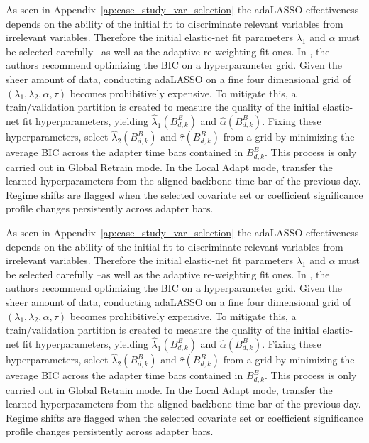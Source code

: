 \documentclass[10pt,a4paper,oneside]{article}
\begin{document}
As seen in Appendix~\ref{ap:case_study_var_selection} the adaLASSO effectiveness depends on the ability of the initial fit to discriminate relevant variables from irrelevant variables. Therefore the initial elastic-net fit parameters \(\lambda_1\) and \(\alpha\) must be selected carefully --as well as the adaptive re-weighting fit ones. In \cite{MEDEIROS2016255}, the authors recommend optimizing the BIC on a hyperparameter grid. Given the sheer amount of data, conducting adaLASSO on a fine four dimensional grid of \((\lambda_1, \lambda_2, \alpha, \tau)\) becomes prohibitively expensive. To mitigate this, a train/validation partition is created to measure the quality of the initial elastic-net fit hyperparameters, yielding  \(\hat{\lambda}_1 \left( B^B_{d, k} \right)\) and \(\hat{\alpha}\left( B^B_{d, k} \right)\). Fixing these hyperparameters, select \(\hat{\lambda}_2\left( B^B_{d, k} \right)\) and \(\hat{\tau}\left( B^B_{d,k} \right)\) from a grid by minimizing the average BIC across the adapter time bars contained in \(B^B_{d,k}\). This process is only carried out in Global Retrain mode. In the Local Adapt mode, transfer the learned hyperparameters from the aligned backbone time bar of the previous day. Regime shifts are flagged when the selected covariate set or coefficient significance profile changes persistently across adapter bars.

As seen in Appendix~\ref{ap:case_study_var_selection} the adaLASSO effectiveness depends on the ability of the initial fit to discriminate relevant variables from irrelevant variables. Therefore the initial elastic-net fit parameters \(\lambda_1\) and \(\alpha\) must be selected carefully --as well as the adaptive re-weighting fit ones. In \cite{MEDEIROS2016255}, the authors recommend optimizing the BIC on a hyperparameter grid. Given the sheer amount of data, conducting adaLASSO on a fine four dimensional grid of \((\lambda_1, \lambda_2, \alpha, \tau)\) becomes prohibitively expensive. To mitigate this, a train/validation partition is created to measure the quality of the initial elastic-net fit hyperparameters, yielding  \(\hat{\lambda}_1 \left( B^B_{d, k} \right)\) and \(\hat{\alpha}\left( B^B_{d, k} \right)\). Fixing these hyperparameters, select \(\hat{\lambda}_2\left( B^B_{d, k} \right)\) and \(\hat{\tau}\left( B^B_{d,k} \right)\) from a grid by minimizing the average BIC across the adapter time bars contained in \(B^B_{d,k}\). This process is only carried out in Global Retrain mode. In the Local Adapt mode, transfer the learned hyperparameters from the aligned backbone time bar of the previous day. Regime shifts are flagged when the selected covariate set or coefficient significance profile changes persistently across adapter bars.
\end{document}
